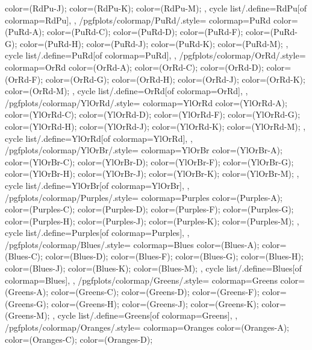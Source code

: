 {{{      color=(RdPu-J);
      color=(RdPu-K);
      color=(RdPu-M);
    },
    cycle list/.define={RdPu}{[of colormap=RdPu]},
  },
  /pgfplots/colormap/PuRd/.style={
    colormap={PuRd}{
      color=(PuRd-A);
      color=(PuRd-C);
      color=(PuRd-D);
      color=(PuRd-F);
      color=(PuRd-G);
      color=(PuRd-H);
      color=(PuRd-J);
      color=(PuRd-K);
      color=(PuRd-M);
    },
    cycle list/.define={PuRd}{[of colormap=PuRd]},
  },
  /pgfplots/colormap/OrRd/.style={
    colormap={OrRd}{
      color=(OrRd-A);
      color=(OrRd-C);
      color=(OrRd-D);
      color=(OrRd-F);
      color=(OrRd-G);
      color=(OrRd-H);
      color=(OrRd-J);
      color=(OrRd-K);
      color=(OrRd-M);
    },
    cycle list/.define={OrRd}{[of colormap=OrRd]},
  },
  /pgfplots/colormap/YlOrRd/.style={
    colormap={YlOrRd}{
      color=(YlOrRd-A);
      color=(YlOrRd-C);
      color=(YlOrRd-D);
      color=(YlOrRd-F);
      color=(YlOrRd-G);
      color=(YlOrRd-H);
      color=(YlOrRd-J);
      color=(YlOrRd-K);
      color=(YlOrRd-M);
    },
    cycle list/.define={YlOrRd}{[of colormap=YlOrRd]},
  },
  /pgfplots/colormap/YlOrBr/.style={
    colormap={YlOrBr}{
      color=(YlOrBr-A);
      color=(YlOrBr-C);
      color=(YlOrBr-D);
      color=(YlOrBr-F);
      color=(YlOrBr-G);
      color=(YlOrBr-H);
      color=(YlOrBr-J);
      color=(YlOrBr-K);
      color=(YlOrBr-M);
    },
    cycle list/.define={YlOrBr}{[of colormap=YlOrBr]},
  },
  /pgfplots/colormap/Purples/.style={
    colormap={Purples}{
      color=(Purples-A);
      color=(Purples-C);
      color=(Purples-D);
      color=(Purples-F);
      color=(Purples-G);
      color=(Purples-H);
      color=(Purples-J);
      color=(Purples-K);
      color=(Purples-M);
    },
    cycle list/.define={Purples}{[of colormap=Purples]},
  },
  /pgfplots/colormap/Blues/.style={
    colormap={Blues}{
      color=(Blues-A);
      color=(Blues-C);
      color=(Blues-D);
      color=(Blues-F);
      color=(Blues-G);
      color=(Blues-H);
      color=(Blues-J);
      color=(Blues-K);
      color=(Blues-M);
    },
    cycle list/.define={Blues}{[of colormap=Blues]},
  },
  /pgfplots/colormap/Greens/.style={
    colormap={Greens}{
      color=(Greens-A);
      color=(Greens-C);
      color=(Greens-D);
      color=(Greens-F);
      color=(Greens-G);
      color=(Greens-H);
      color=(Greens-J);
      color=(Greens-K);
      color=(Greens-M);
    },
    cycle list/.define={Greens}{[of colormap=Greens]},
  },
  /pgfplots/colormap/Oranges/.style={
    colormap={Oranges}{
      color=(Oranges-A);
      color=(Oranges-C);
      color=(Oranges-D);
}}}
